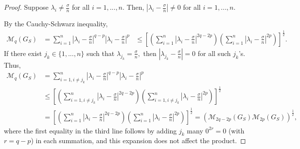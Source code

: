 \documentclass[12pt,a4paper,reqno]{amsart}
\numberwithin{equation}{section}
\theoremstyle{plain}
\theoremstyle{definition}
\newcommand{\<}{\langle}
\renewcommand{\>}{\rangle}
\newcommand{\cM}{{\mathcal M}}
\begin{document}
\begin{proof} 
Suppose $\lambda_i \neq \frac{\sigma}{n}$ for all $i=1,...,n.$ Then, $|\lambda_i- \frac{\sigma}{n}|\neq 0$ for all $i=1,...,n.$ 

\noindent By the Cauchy-Schwarz inequality,
\begin{align*}
\cM_q(G_S)
&= \sum^n_{i=1} \left| \lambda_i-\frac{\sigma}{n}\right|^{q-p} \left| \lambda_i-\frac{\sigma}{n}\right|^{p}
&\leq \left[ \left(\sum^n_{i=1} \left| \lambda_i-\frac{\sigma}{n}\right|^{2q-2p}\right) \left( \sum^n_{i=1}\left| \lambda_i-\frac{\sigma}{n}\right|^{2p}\right) \right]^{\frac12}.   
\end{align*}
If there exist $j_k\in \{1,...,n\}$ such that $\lambda_{j_k} =\frac{\sigma}{n},$ then $|\lambda_{j_k} -\frac{\sigma}{n}|=0$ for all such $j_k$'s.  Thus,
\begin{align*}
\cM_q(G_S)
&= \sum^n_{i=1, i \neq j_k} \left| \lambda_i-\frac{\sigma}{n}\right|^{q-p} \left| \lambda_i-\frac{\sigma}{n}\right|^{p} \\
&\leq \left[ \left(\sum^n_{i=1, i \neq j_k} \left| \lambda_i-\frac{\sigma}{n}\right|^{2q-2p}\right) \left( \sum^n_{i=1, i \neq j_k}\left| \lambda_i-\frac{\sigma}{n}\right|^{2p}\right) \right]^{\frac12} \\
&= \left[ \left(\sum^n_{i=1} \left| \lambda_i-\frac{\sigma}{n}\right|^{2q-2p}\right) \left( \sum^n_{i=1}\left| \lambda_i-\frac{\sigma}{n}\right|^{2p}\right) \right]^{\frac12} = \left(\cM_{2q-2p}(G_S)\cM_{2p}(G_S)\right)^{\frac{1}{2}},
\end{align*}
where the first equality in the third line follows by adding $j_k$ many $0^{2r}=0$ (with $r=q-p$) in each summation, and this expansion does not affect the product.
\end{proof}
\end{document}
